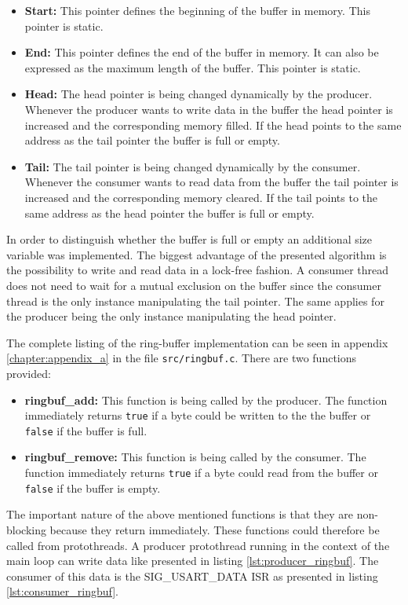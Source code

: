 \begin{itemize}
\item \textbf{Start:} This pointer defines the beginning of the buffer in memory. This pointer is static.
\item \textbf{End:} This pointer defines the end of the buffer in memory. It can also be expressed as the maximum length of the buffer. This pointer is static.
\item \textbf{Head:} The head pointer is being changed dynamically by the producer. Whenever the producer wants to write data in the buffer the head pointer is increased and the corresponding memory filled. If the head points to the same address as the tail pointer the buffer is full or empty.
\item \textbf{Tail:} The tail pointer is being changed dynamically by the consumer. Whenever the consumer wants to read data from the buffer the tail pointer is increased and the corresponding memory cleared. If the tail points to the same address as the head pointer the buffer is full or empty.
\end{itemize}

In order to distinguish whether the buffer is full or empty an additional size variable was implemented. The biggest advantage of the presented algorithm is the possibility to write and read data in a lock-free fashion. A consumer thread does not need to wait for a mutual exclusion on the buffer since the consumer thread is the only instance manipulating the tail pointer. The same applies for the producer being the only instance manipulating the head pointer.

The complete listing of the ring-buffer implementation can be seen in appendix \ref{chapter:appendix_a} in the file \texttt{src/ringbuf.c}. There are two functions provided:

\begin{itemize}
\item \textbf{ringbuf\_add:} This function is being called by the producer. The function immediately returns \texttt{true} if a byte could be written to the the buffer or \texttt{false} if the buffer is full.
\item \textbf{ringbuf\_remove:} This function is being called by the consumer. The function immediately returns \texttt{true} if a byte could read from the buffer or \texttt{false} if the buffer is empty.
\end{itemize}

The important nature of the above mentioned functions is that they are non-blocking because they return immediately. These functions could therefore be called from protothreads. A producer protothread running in the context of the main loop can write data like presented in listing \ref{lst:producer_ringbuf}. The consumer of this data is the SIG\_USART\_DATA ISR as presented in listing \ref{lst:consumer_ringbuf}.

